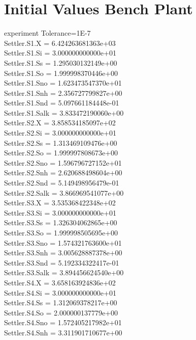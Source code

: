 \section{Initial Values Bench Plant}
\label{sec:AppendixB}
experiment Tolerance=1E-7\\
Settler.S1.X = 6.424263681363e+03\\
Settler.S1.Si = 3.000000000000e+01\\
Settler.S1.Ss = 1.295030132149e+00\\
Settler.S1.So = 1.999998370446e+00\\
Settler.S1.Sno = 1.623473547370e+01\\
Settler.S1.Snh = 2.356727799827e+00\\
Settler.S1.Snd = 5.097661184448e-01\\
Settler.S1.Salk = 3.833472190060e+00\\
Settler.S2.X = 3.858534185097e+02\\
Settler.S2.Si = 3.000000000000e+01\\
Settler.S2.Ss = 1.313469109476e+00\\
Settler.S2.So = 1.999997808673e+00\\
Settler.S2.Sno = 1.596796727152e+01\\
Settler.S2.Snh = 2.620688498604e+00\\
Settler.S2.Snd = 5.149498956479e-01\\
Settler.S2.Salk = 3.866969541077e+00\\
Settler.S3.X = 3.535368422348e+02\\
Settler.S3.Si = 3.000000000000e+01\\
Settler.S3.Ss = 1.326304062865e+00\\
Settler.S3.So = 1.999998505695e+00\\
Settler.S3.Sno = 1.574321763600e+01\\
Settler.S3.Snh = 3.005628887378e+00\\
Settler.S3.Snd = 5.192334322417e-01\\
Settler.S3.Salk = 3.894456624540e+00\\
Settler.S4.X = 3.658163924836e+02\\
Settler.S4.Si = 3.000000000000e+01\\
Settler.S4.Ss = 1.312069378217e+00\\
Settler.S4.So = 2.000000137779e+00\\
Settler.S4.Sno = 1.572405217982e+01\\
Settler.S4.Snh = 3.311901710677e+00\\
